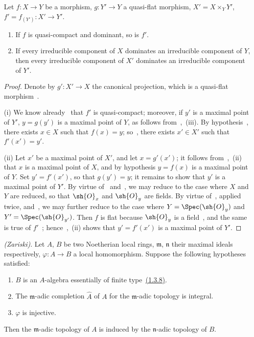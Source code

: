 \begin{proposition}[2.3.7]
\label{IV.2.3.7}
Let $f:X\to Y$ be a morphism, $g:Y'\to Y$ a quasi-flat morphism, $X'=X\times_Y Y'$, $f'=f_{(Y')}:X'\to Y'$.
\begin{enumerate}
  \item[(i)] If $f$ is quasi-compact and dominant, so is $f'$.
  \item[(ii)] If every irreducible component of $X$ dominates an irreducible component of $Y$, then every irreducible component of $X'$ dominates an irreducible component of $Y'$.
\end{enumerate}
\end{proposition}

\begin{proof}
Denote by $g':X'\to X$ the canonical projection, which is a quasi-flat morphism~.

(i) We know already~ that $f'$ is quasi-compact; moreover, if $y'$ is a maximal point of $Y'$, $y=g(y')$ is a maximal point of $Y$, as follows from~,~(iii).
By hypothesis~, there exists $x\in X$ such that $f(x)=y$; so~, there exists $x'\in X'$ such that $f'(x')=y'$.

(ii) Let $x'$ be a maximal point of $X'$, and let $x=g'(x')$; it follows from~,~(ii) that $x$ is a maximal point of $X$, and by hypothesis $y=f(x)$ is a maximal point of $Y$.
Set $y'=f'(x')$, so that $g(y')=y$; it remains to show that $y'$ is a maximal point of $Y'$.
By virtue of~ and~, we may reduce to the case where $X$ and $Y$ are reduced, so that $\sh{O}_x$ and $\sh{O}_y$ are fields.
By virtue of~, applied twice, and~, we may further reduce to the case where $Y=\Spec(\sh{O}_y)$ and $Y'=\Spec(\sh{O}_{y'})$.
Then $f$ is flat because $\sh{O}_y$ is a field~, and the same is true of $f'$~; hence~,~(ii) shows that $y'=f'(x')$ is a maximal point of $Y'$.
\end{proof}

\begin{corollary}[2.3.8]
\label{IV.2.3.8}
\emph{(Zariski).}
Let $A$, $B$ be two Noetherian local rings, $\mathfrak{m}$, $\mathfrak{n}$ their maximal ideals respectively, $\varphi:A\to B$ a local homomorphism. Suppose the following hypotheses satisfied:
\begin{enumerate}
  \item[$1^\circ$] $B$ is an $A$-algebra essentially of finite type~{\hyperlink{ega4.c04.statement.1-3-8}{(1.3.8)}}.
  \item[$2^\circ$] The $\mathfrak{m}$-adic completion $\widehat{A}$ of $A$ for the $\mathfrak{m}$-adic topology is integral.
  \item[$3^\circ$] $\varphi$ is injective.
\end{enumerate}
Then the $\mathfrak{m}$-adic topology of $A$ is induced by the $\mathfrak{n}$-adic topology of $B$.
\end{corollary}

